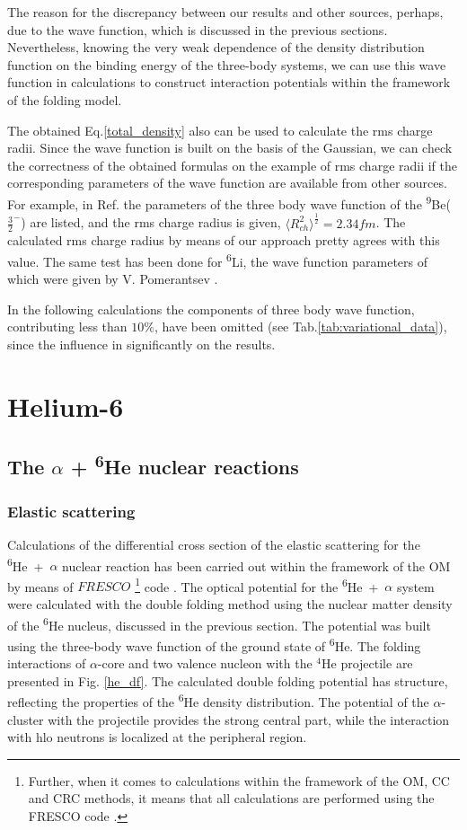 \documentclass[
12pt, %
oneside, %
english, %
onehalfspacing, %
onehalfspacing, %
headsepline, %
]{MastersDoctoralThesis} %
\newcommand{\he}{\textsuperscript{6}He\xspace}
\newcommand{\li}{\textsuperscript{6}Li\xspace}
\newcommand{\be}{\textsuperscript{9}Be\xspace}
\begin{document}
The reason for the discrepancy between our results and other sources, perhaps, due to the wave function, which is discussed in the previous sections. Nevertheless, knowing the very weak dependence of the density distribution function on the binding energy of the three-body systems, we can use this wave function in calculations to construct interaction potentials within the framework of the folding model.

The obtained Eq.\ref{total_density} also can be used to calculate the rms charge radii. 
Since the wave function is built on the basis of the Gaussian, we can check the correctness of the obtained formulas on the example of rms charge radii if the corresponding parameters of the wave function are available from other sources.
For example, in Ref. \cite{voronchev1994study} the parameters of the three body wave function of the \be ($\tfrac{3}{2}^-$) are listed, and the rms charge radius  is given, $\langle R_{ch}^2 \rangle^{\frac{1}{2}} = 2.34 fm$. 
The calculated rms charge radius by means of our approach pretty agrees with this value. 
The same test has been done for \li, the wave function parameters of which were given by V. Pomerantsev \cite{pomerantsevPrivate}.

In the following calculations the components of three body wave function, contributing less than $10\%$, have been omitted (see Tab.\ref{tab:variational_data}), since the  influence in significantly on the results.

\chapter{Helium-6}
\section{The $\alpha$ + \he nuclear reactions }
\subsection{Elastic scattering}

Calculations of the differential cross section of the elastic scattering for the \he~+~$\alpha$ nuclear reaction has been carried out within the framework of the OM by means of $FRESCO$
\footnote{Further, when it comes to calculations within the framework of the OM, CC and CRC methods, it means that all calculations are performed using the FRESCO code \cite{fresco}.} 
code \cite{fresco}.
The optical potential for the \he~+~$\alpha$ system were calculated with the double folding method using the nuclear matter density of the \he nucleus, discussed in the previous section. 
The potential was built using the three-body wave function of the ground state of \he. 
The folding interactions of $\alpha$-core and two valence nucleon with the $^4$He projectile are presented in Fig. \ref{he_df}.
The calculated double folding potential has structure, reflecting the properties of the \he density distribution.
The potential of the $\alpha$-cluster with the projectile provides the strong central part, while the interaction with hlo neutrons is localized at the peripheral region.
\end{document}
